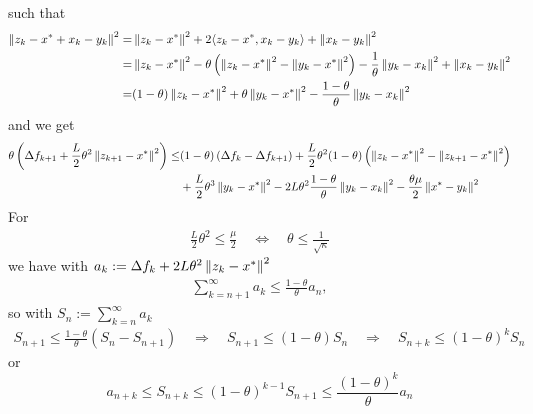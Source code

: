 \documentclass[12pt,english]{article}
\begin{document}
%
such that
%
\begin{align*}
 \left\|z_k- x^* + x_k-y_k\right\|^2 =&  \left\|z_k- x^* \right\|^2 + 2\langle z_k- x^*,x_k-y_k\rangle + \left\|x_k-y_k\right\|^2\\
 =&  \left\|z_k- x^* \right\|^2 - \theta\left(\left\|z_k- x^*\right\|^2-\left\|y_k- x^*\right\|^2\right) - \frac{1}{\theta}\left\|y_k-x_k\right\|^2 + \left\|x_k-y_k\right\|^2\\
 =&  (1-\theta)\left\|z_k- x^* \right\|^2 + \theta\left\|y_k- x^*\right\|^2 - \frac{1-\theta}{\theta}\left\|y_k-x_k\right\|^2 
\end{align*}
%
and we get
%
\begin{align*}
\theta\left(\Delta f_{k+1} + \frac{L}{2}\theta^2\left\|z_{k+1} - x^*\right\|^2\right) \le& (1-\theta)\left(\Delta f_k-\Delta f_{k+1}\right)  + \frac{L}{2}\theta^2(1-\theta)\left( \left\|z_k- x^* \right\|^2 - \left\|z_{k+1} - x^*\right\|^2\right)\\
&+ \frac{L}{2}\theta^3\left\|y_k- x^*\right\|^2 - 2L\theta^2\frac{1-\theta}{\theta}\left\|y_k-x_k\right\|^2  -\frac{\theta\mu}{2}\left\|x^*-y_k\right\|^2
\end{align*}
%
For 
%
\begin{align*}
\frac{L}{2}\theta^2 \le \frac{\mu}{2} \quad\Leftrightarrow\quad \theta\le \frac{1}{\sqrt{\kappa}}
\end{align*}
%
we have with $a_k:=\Delta f_{k} + 2L\theta^2\left\|z_{k} - x^*\right\|^2$
%
\begin{align*}
\sum_{k=n+1}^{\infty} a_k \le \frac{1-\theta}{\theta} a_n,
\end{align*}
%
so with $S_n:= \sum_{k=n}^{\infty} a_k$
%
\begin{align*}
S_{n+1} \le \frac{1-\theta}{\theta} \left(S_n-S_{n+1}\right) \quad\Rightarrow\quad S_{n+1} \le (1-\theta )S_n
\quad\Rightarrow\quad  S_{n+k} \le (1-\theta )^k S_n
\end{align*}
%
or
%
\begin{equation}\label{eq:}
a_{n+k} \le S_{n+k} \le (1-\theta )^{k-1} S_{n+1}\le \frac{(1-\theta )^{k}}{\theta} a_{n}
\end{equation}
%









\printbibliography
%
\end{document}
